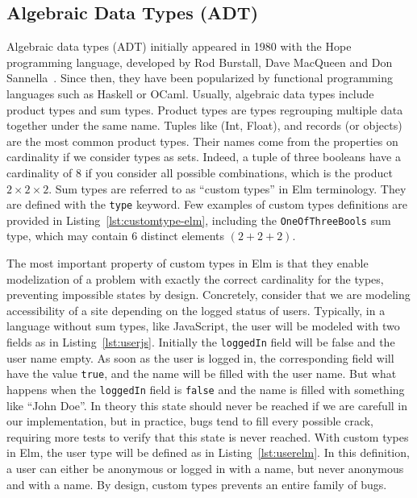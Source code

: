 


\subsection{Algebraic Data Types (ADT)}%
\label{sub:algebraic_data_types_adt_}

Algebraic data types (ADT) initially appeared in 1980 with the Hope programming language,
developed by Rod Burstall, Dave MacQueen and Don Sannella~\cite{burstall1980hope}.
Since then, they have been popularized by functional programming languages
such as Haskell or OCaml.
Usually, algebraic data types include product types and sum types.
Product types are types regrouping multiple data together under the same name.
Tuples like (Int, Float), and records (or objects) are the most common product types.
Their names come from the properties on cardinality if we consider types as sets.
Indeed, a tuple of three booleans have a cardinality of 8 if you consider
all possible combinations, which is the product $2\times2\times2$.
Sum types are referred to as ``custom types'' in Elm terminology.
They are defined with the \verb|type| keyword.
Few examples of custom types definitions are provided in Listing~\ref{lst:customtype-elm},
including the \verb|OneOfThreeBools| sum type,
which may contain 6 distinct elements $(2 + 2 + 2)$.



The most important property of custom types in Elm
is that they enable modelization of a problem with exactly the correct
cardinality for the types, preventing impossible states by design.
Concretely, consider that we are modeling accessibility of a site
depending on the logged status of users.
Typically, in a language without sum types, like JavaScript,
the user will be modeled with two fields as in Listing~\ref{lst:userjs}.
Initially the \verb|loggedIn| field will be false and the user name empty.
As soon as the user is logged in,
the corresponding field will have the value \verb|true|,
and the name will be filled with the user name.
But what happens when the \verb|loggedIn| field is \verb|false| and
the name is filled with something like ``John Doe''.
In theory this state should never be reached if we are carefull in our implementation,
but in practice, bugs tend to fill every possible crack,
requiring more tests to verify that this state is never reached.
With custom types in Elm, the user type will be defined as in Listing~\ref{lst:userelm}.
In this definition, a user can either be anonymous or logged in with a name,
but never anonymous and with a name.
By design, custom types prevents an entire family of bugs.

